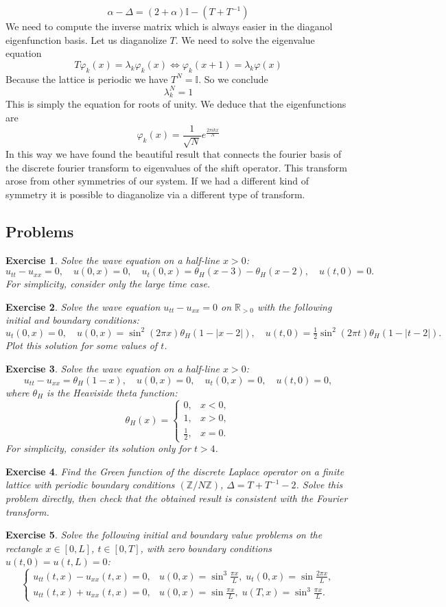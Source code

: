\documentclass[11pt,a4paper]{article}
\newtheorem*{exercise}{Exercise}
\newcommand{\problems}[1]{
	\subsection*{Problems}
	#1
}
\begin{document}
$$
\alpha - \Delta = (2+\alpha)\mathbb{I}-(T+T^{-1}
)$$
We need to compute the inverse matrix which is always easier in the diaganol eigenfunction basis. Let us diaganolize $T$. We need to solve the eigenvalue equation
$$
T\varphi_{k}(x)=\lambda_{k}\varphi_{k}(x)\Leftrightarrow \varphi_{k}(x+1) = \lambda_{k}\varphi(x)
$$
Because the lattice is periodic we have $T^{N} = \mathbb{I}$. So we conclude 
$$
\lambda_{k}^{N} = 1
$$
This is simply the equation for roots of unity. We deduce that the eigenfunctions are
$$
\varphi_{k}(x)  =\frac{1}{\sqrt{N}} e^{\frac{2\pi i kx}{N}}
$$
In this way we have found the beautiful result that connects the fourier basis of the discrete fourier transform to eigenvalues of the shift operator. This transform arose from other symmetries of our system. If we had a different kind of symmetry it is possible to diaganolize via a different type of transform.
\problems{
	\begin{exercise}
		Solve the wave equation on a half-line $x > 0$:
		\[
		u_{tt} - u_{xx} = 0, \quad u(0, x) = 0, \quad u_t(0, x) = \theta_H(x - 3) - \theta_H(x - 2), \quad u(t, 0) = 0.
		\]
		For simplicity, consider only the large time case.
	\end{exercise}
	\begin{exercise}
		Solve the wave equation $u_{tt} - u_{xx} = 0$ on $\mathbb{R}_{>0}$ with the following initial and boundary conditions:
		\[
		u_t(0, x) = 0, \quad u(0, x) = \sin^2(2\pi x)\theta_H(1 - |x - 2|), \quad
		u(t, 0) = \tfrac{1}{2}\sin^2(2\pi t)\theta_H(1 - |t - 2|).
		\]
		Plot this solution for some values of $t$.
	\end{exercise}
	\begin{exercise}
		Solve the wave equation on a half-line $x > 0$:
		\[
		u_{tt} - u_{xx} = \theta_H(1 - x), \quad u(0, x) = 0, \quad u_t(0, x) = 0, \quad u(t, 0) = 0,
		\]
		where $\theta_H$ is the Heaviside theta function:
		\[
		\theta_H(x) =
		\begin{cases}
			0, & x < 0, \\
			1, & x > 0, \\
			\frac{1}{2}, & x = 0.
		\end{cases}
		\]
		For simplicity, consider its solution only for $t > 4$.
	\end{exercise}
\begin{exercise}
	Find the Green function of the discrete Laplace operator on a finite lattice with periodic boundary conditions $(\mathbb{Z}/N\mathbb{Z})$, $\Delta = T + T^{-1} - 2$.  
	Solve this problem directly, then check that the obtained result is consistent with the Fourier transform.
\end{exercise}
\begin{exercise}
	Solve the following initial and boundary value problems on the rectangle $x \in [0, L]$, $t \in [0, T]$, with zero boundary conditions $u(t, 0) = u(t, L) = 0$:
	\[
	\begin{cases}
		u_{tt}(t, x) - u_{xx}(t, x) = 0, & u(0, x) = \sin^3 \frac{\pi x}{L}, \; u_t(0, x) = \sin \frac{2\pi x}{L}, \\
		u_{tt}(t, x) + u_{xx}(t, x) = 0, & u(0, x) = \sin \frac{\pi x}{L}, \; u(T, x) = \sin^3 \frac{\pi x}{L}.
	\end{cases}
	\]
\end{exercise}
}
\end{document}

